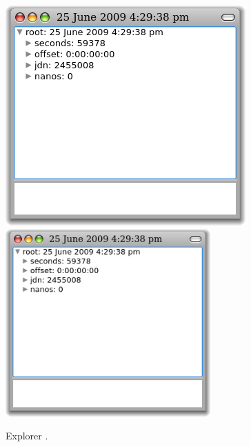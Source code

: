 \documentclass[a4paper,10pt,twoside]{book}
\begin{document}
\begin{figure}[tbp]
\begin{minipage}{0.48\textwidth}
	\begin{center}
	\ifluluelse
		{\includegraphics[width=\textwidth]{exploreTimeStampNow}}
		{\includegraphics[width=0.7\textwidth]{exploreTimeStampNow}}
	\end{center}
	\caption{Explorer .}
\end{minipage}
\hfill
\begin{minipage}{0.48\textwidth}
	\begin{center}
	\ifluluelse

\end{center}
\end{minipage}
\end{figure}
\end{document}

